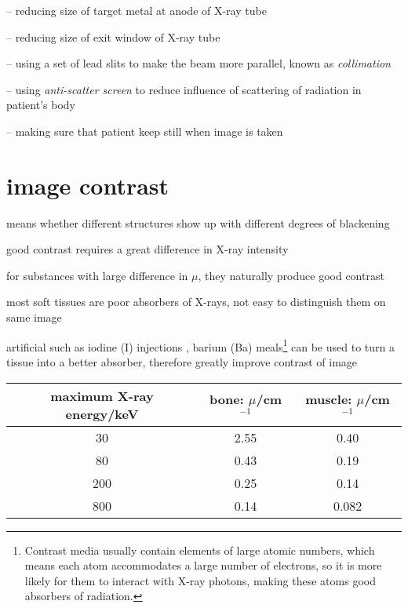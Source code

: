 \begin{compactitem}
	\item[--] reducing size of target metal at anode of X-ray tube
	
	\item[--] reducing size of exit window of X-ray tube
	
	\item[--] using a set of lead slits to make the beam more parallel, known as \emph{collimation}
	
	\item[--] using \emph{anti-scatter screen} to reduce influence of scattering of radiation in patient's body
	
	\item[--] making sure that patient keep still when image is taken
\end{compactitem}


\section*{image contrast}

 means whether different structures show up with different degrees of blackening

good contrast requires a great difference in X-ray intensity

\cmt for substances with large difference in $\mu$, they naturally produce good contrast

\cmt most soft tissues are poor absorbers of X-rays, not easy to distinguish them on same image

artificial  such as iodine (I) injections , barium (Ba) meals\footnote{Contrast media usually contain elements of large atomic numbers, which means each atom accommodates a large number of electrons, so it is more likely for them to interact with X-ray photons, making these atoms good absorbers of radiation.} can be used to turn a tissue into a better absorber, therefore greatly improve contrast of image




\newpage


\begin{table}[ht]
	\begin{center}
		\begin{tabular}{|c|c|c|}
			\hline
			maximum X-ray energy/keV & bone: $\mu$/cm$^{-1}$ & muscle: $\mu$/cm$^{-1}$ \\ \hline
			30 & 2.55 & 0.40 \\ \hline
			80 & 0.43 & 0.19 \\ \hline
			200 & 0.25 & 0.14 \\ \hline
			800 & 0.14 & 0.082 \\ \hline
		\end{tabular}
	\end{center}
\end{table}




